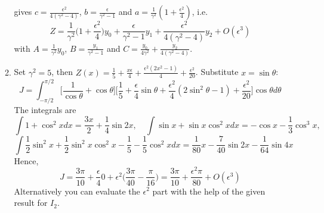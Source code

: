 \documentclass[a4paper]{article}
\begin{document}
\begin{ans}
\begin{enumerate}[label=(\alph*)]
\begin{enumerate}[label=(\roman*)]
gives $c=\frac{\epsilon^2}{4(\gamma^2-4)}$, $b=\frac{\epsilon}{\gamma^2-1}$ and $a=\frac{1}{\gamma^2}(1+\frac{\epsilon^2}{4})$, i.e.
$$Z=\frac{1}{\gamma^2}\bigg(1+\frac{\epsilon^2}{4}\bigg)y_0+\frac{\epsilon}{\gamma^2-1}y_1+\frac{\epsilon^2}{4(\gamma^2-4)}y_2+O(\epsilon^3)$$
with $A=\frac{1}{\gamma^2}y_0$, $B=\frac{y_1}{\gamma^2-1}$ and $C=\frac{y_0}{4\gamma^2}+\frac{y_2}{4(\gamma^2-4)}$.
\item 
Set $\gamma^2=5$, then $Z(x)=\frac{1}{5}+\frac{x\epsilon}{4}+\frac{\epsilon^2(2x^2-1)}{4}+\frac{\epsilon^2}{20}$. Substitute $x=\sin\theta$:
$$J=\int_{-\pi/2}^{\pi/2}\bigg[\frac{1}{\cos\theta}+\cos\theta\bigg]\bigg[\frac{1}{5}+\frac{\epsilon}{4}\sin\theta+\frac{\epsilon^2}{4}(2\sin^2\theta-1)+\frac{\epsilon^2}{20}\bigg]\cos\theta d\theta$$
The integrals are $$\int 1+\cos^2xdx=\frac{3x}{2}+\frac{1}{4}\sin 2x,\quad\int\sin x+\sin x\cos^2xdx=-\cos x-\frac{1}{3}\cos^3x,$$
$$\int\frac{1}{2}\sin^2x+\frac{1}{2}\sin^2x\cos^2x-\frac{1}{5}-\frac{1}{5}\cos^2xdx=\frac{1}{80}x-\frac{7}{40}\sin 2x-\frac{1}{64}\sin 4x$$ Hence,
$$J=\frac{3\pi}{10}+\frac{\epsilon}{4}0+\epsilon^2\bigg(\frac{3\pi}{40}-\frac{\pi}{16}\bigg)=\frac{3\pi}{10}+\frac{\epsilon^2\pi}{80}+O(\epsilon^3)$$
Alternatively you can evaluate the $\epsilon^2$ part with the help of the given result for $I_2$.
\end{enumerate}
\end{enumerate}
\end{ans}
\newpage
\end{document}
